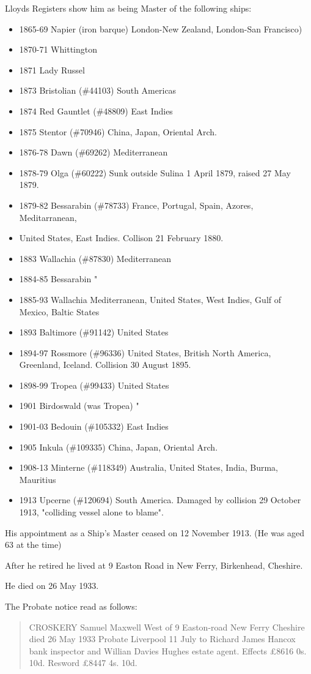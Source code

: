 Lloyds Registers show him as being Master of the following ships:\cite{LloydsRegCroskery}
\begin{itemize}[nosep]
\item 1865-69 Napier (iron barque) London-New Zealand, London-San Francisco)
\item 1870-71 Whittington
\item 1871 Lady Russel
\item 1873 Bristolian (\#44103) South Americas
\item 1874 Red Gauntlet (\#48809) East Indies
\item 1875 Stentor (\#70946) China, Japan, Oriental Arch.
\item 1876-78 Dawn (\#69262) Mediterranean
\item 1878-79 Olga (\#60222) Sunk outside Sulina 1 April 1879, raised 27 May 1879.
\item 1879-82 Bessarabin (\#78733) France, Portugal, Spain, Azores, Meditarranean,
\item United States, East Indies. Collison 21 February 1880.
\item 1883 Wallachia (\#87830) Mediterranean
\item 1884-85 Bessarabin "
\item 1885-93 Wallachia Mediterranean, United States, West Indies, Gulf of Mexico, Baltic States
\item 1893 Baltimore (\#91142) United States
\item 1894-97 Rossmore (\#96336) United States, British North America, Greenland, Iceland. Collision 30 August 1895.
\item 1898-99 Tropea (\#99433) United States
\item 1901 Birdoswald (was Tropea) "
\item 1901-03 Bedouin (\#105332) East Indies
\item 1905 Inkula (\#109335) China, Japan, Oriental Arch.
\item 1908-13 Minterne (\#118349) Australia, United States, India, Burma, Mauritius
\item 1913 Upcerne (\#120694) South America. Damaged by collision 29 October 1913, "colliding vessel alone to blame".
\end{itemize}

His appointment as a Ship's Master ceased on  12 November 1913. (He was aged 63 at the time)

After he retired he lived at 9 Easton Road in New Ferry, Birkenhead, Cheshire.

He died on 26 May 1933.\cite{WestCroskeryProbate}

The Probate notice read as follows:\cite{WestCroskeryProbate}
\begin{quotation}
CROSKERY Samuel Maxwell West of 9 Easton-road New Ferry Cheshire died 26 May 1933 Probate Liverpool 11 July to Richard James Hancox bank inspector and Willian Davies Hughes estate agent.  Effects \pounds 8616 0s. 10d. Resword \pounds 8447 4s. 10d.
\end{quotation}
